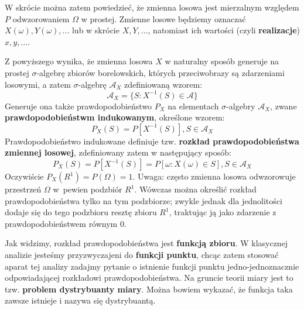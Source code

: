 \documentclass[10pt,a4paper]{article}
\begin{document}
W skrócie można zatem powiedzieć, że zmienna losowa jest mierzalnym względem $P$ odwzorowaniem $\Omega$ w prostej. Zmienne losowe będziemy oznaczać 
$X(\omega), Y(\omega), ...$ lub w skrócie $X, Y, ...$, natomiast ich wartości (czyli \textbf{realizacje}) $x, y, ...$.

Z powyższego wynika, że zmienna losowa $X$ w naturalny sposób generuje na prostej $\sigma$-algebrę zbiorów borelowskich, których przeciwobrazy są zdarzeniami losowymi, a zatem $\sigma$-algebrę $\mathscr{A}_X$ zdefiniowaną wzorem:
\begin{equation}
\mathscr{A}_X = \{S: X^{-1}(S)\in\mathscr{A}\}
\end{equation}
Generuje ona także prawdopodobieństwo $P_X$ na elementach $\sigma$-algebry $\mathscr{A}_X$, zwane \textbf{prawdopodobieństwm indukowanym}, określone wzorem:
\begin{equation}
P_X(S) = P[X^{-1}(S)], S\in\mathscr{A}_X
\end{equation}
Prawdopodobieństwo indukowane definiuje tzw. \textbf{rozkład prawdopodobieństwa zmiennej losowej}, zdefiniowany zatem w następujący sposób:
\begin{equation}
P_X(S) = P[X^{-1}(S)] = P[\omega: X(\omega)\in S], S\in\mathscr{A}_X
\end{equation}
Oczywiście $ P_X(R^1) = P(\Omega) = 1 $.
Uwaga: często zmienna losowa odwzorowuje przestrzeń $\Omega$ w~pewien podzbiór $R^1$. Wówczas można określić rozkład prawdopodobieństwa tylko na tym podzbiorze;
zwykle jednak dla jednolitości dodaje się do tego podzbioru resztę zbioru $R^1$, traktując ją jako zdarzenie z prawdopodobieństwem równym 0.

Jak widzimy, rozkład prawdopodobieństwa jest \textbf{funkcją zbioru}. W klasycznej analizie jesteśmy przyzwyczajeni do \textbf{funkcji punktu}, chcąc zatem stosować aparat
tej analizy zadajmy pytanie o istnienie funkcji punktu jedno-jednoznacznie odpowiadającej rozkładowi prawdopodobieństwa. Na gruncie teorii miary jest to tzw. 
\textbf{problem dystrybuanty miary}. Można bowiem wykazać, że funkcja taka zawsze istnieje i nazywa się dystrybuantą.
\end{document}
